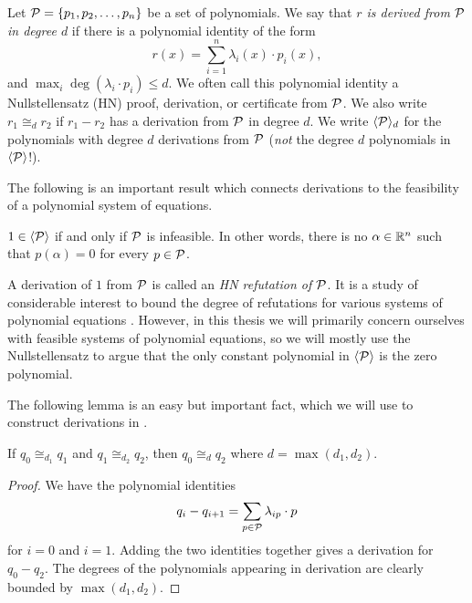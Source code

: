 \begin{definition}
Let $\mathcal P = \{p_1, p_2, \dots, p_n\}$ be a set of polynomials. We say that \emph{$r$ is derived from $\mathcal P$ in degree $d$} if there is a polynomial identity of the form
\[r(x) = \sum_{i=1}^n \lambda_i(x) \cdot p_i(x),\]
and $\max_i \deg(\lambda_i \cdot p_i) \leq d$. We often call this polynomial identity a Nullstellensatz (HN) proof, derivation, or certificate from $\mathcal P$. We also write $r_1 \cong_d r_2$ if $r_1 - r_2$ has a derivation from $\mathcal P$ in degree $d$. We write $\langle \mathcal P \rangle_d$ for the polynomials with degree $d$ derivations from $\mathcal P$ (\emph{not} the degree $d$ polynomials in $\langle \mathcal P \rangle$!).
\end{definition}

The following is an important result which connects derivations to the feasibility of a polynomial system of equations.
\begin{lemma}\label{lem:nullstellensatz}
$1 \in \langle \mathcal P \rangle$ if and only if $\mathcal P$ is infeasible. In other words, there is no $\alpha \in \mathbb R^n$ such that $p(\alpha) = 0$ for every $p \in \mathcal P$.
\end{lemma}
A derivation of $1$ from $\mathcal P$ is called an \emph{HN refutation of $\mathcal P$}.
It is a study of considerable interest to bound the degree of refutations for various systems of polynomial equations \cite{BIKPP94,BT98,Gri98,BGIP01}.
However, in this thesis we will primarily concern ourselves with feasible systems of polynomial equations, so we will mostly use the Nullstellensatz to argue that the only constant polynomial in $\langle \mathcal P \rangle$ is the zero polynomial. 

The following lemma is an easy but important fact, which we will use to construct derivations in .
\begin{lemma}\label{lem:derivation-chain}
If $q_0 \cong_{d_1} q_1$ and $q_1 \cong_{d_2} q_2$, then $q_0 \cong_d q_2$ where $d = \max(d_1, d_2)$.
\end{lemma}
\begin{proof}
We have the polynomial identities
\[q_i - q_{i+1} = \sum_{p \in \mathcal P} \lambda_{ip} \cdot p\]
for $i = 0$ and $i = 1$. Adding the two identities together gives a derivation for $q_0 - q_2$. The degrees of the polynomials appearing in derivation are clearly bounded by $\max(d_1,d_2)$. 
\end{proof}


